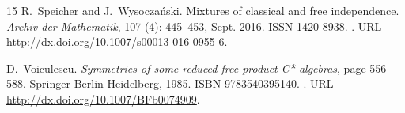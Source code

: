\documentclass[12pt,reqno]{amsart}
\theoremstyle{plain}
\newcommand{\1}{\mathbf{1}}
\begin{document}
\begin{thebibliography}{15}
R.~Speicher and J.~Wysoczański.
\newblock Mixtures of classical and free independence.
\newblock \emph{Archiv der Mathematik}, 107 (4): 445–453,
  Sept. 2016.
\newblock ISSN 1420-8938.
\newblock {}.
\newblock URL \url{http://dx.doi.org/10.1007/s00013-016-0955-6}.

D.~Voiculescu.
\newblock \emph{Symmetries of some reduced free product C*-algebras}, page
  556–588.
\newblock Springer Berlin Heidelberg, 1985.
\newblock ISBN 9783540395140.
\newblock {}.
\newblock URL \url{http://dx.doi.org/10.1007/BFb0074909}.

\end{thebibliography}
\end{document}
